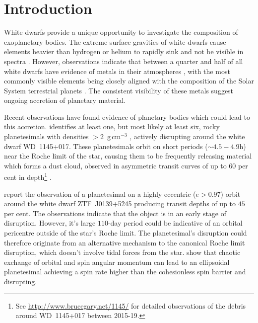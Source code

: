 \documentclass[fleqn,usenatbib]{mnras}
\newcommand{\gcm}{g\,cm$^{-3}$ }	%
\begin{document}


\section{Introduction} \label{sec:intro}
White dwarfs provide a unique opportunity to investigate the composition of exoplanetary bodies. 
The extreme surface gravities of white dwarfs cause elements heavier than hydrogen or helium to rapidly sink and not be visible in spectra \citep{Paquette1986, Wyatt2014}.
However, observations indicate that between a quarter and half of all white dwarfs have evidence of metals in their atmospheres \citep{Zuckerman2010, Koester2014}, with the most commonly visible elements being closely aligned with the composition of the Solar System terrestrial planets \citep{Jura2014, Hollands2018, Doyle2019}.
The consistent visibility of these metals suggest ongoing accretion of planetary material.

Recent observations have found evidence of planetary bodies which could lead to this accretion. 
\cite{Vanderburg2015} identifies at least one, but most likely at least six, rocky planetesimals with densities $>2$~\gcm, actively disrupting around the white dwarf WD~1145+017.
These planetesimals orbit on short periods ($\sim 4.5-4.9$h) near the Roche limit of the star, causing them to be frequently releasing material which forms a dust cloud, observed in asymmetric transit curves of up to $60$ per cent in depth\footnote{See \url{http://www.brucegary.net/1145/} for detailed observations of the debris around WD~1145+017 between 2015-19.} \citep[See also][]{Gansicke2016, Rappaport2016, Zhou2016, Croll2017, Gary2017, Izquierdo2018, Vanderburg2018}.

\cite{Vanderbosch2020} report the observation of a planetesimal on a highly eccentric ($e > 0.97$) orbit around the white dwarf ZTF~J0139+5245 producing transit depths of up to $45$ per cent.
The observations indicate that the object is in an early stage of disruption.
However, it's large $110$-day period could be indicative of an orbital pericentre outside of the star's Roche limit. 
The planetesimal's disruption could therefore originate from an alternative mechanism to the canonical Roche limit disruption, which doesn't involve tidal forces from the star. \cite{Veras2020a} show that chaotic exchange of orbital and spin angular momentum can lead to an ellipsoidal planetesimal achieving a spin rate higher than the cohesionless spin barrier \citep[see fig. 1 of][]{Warner2009} and disrupting.
\end{document}
